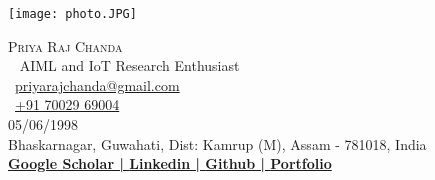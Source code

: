 \documentclass[a4paper]{article}
\begin{document}
\vspace*{-50pt}
\begin{center}
    \begin{minipage}{0.3\textwidth}
        \texttt{[image: photo.JPG]}
    \end{minipage}%
    \begin{minipage}{0.7\textwidth}
        \hspace*{0pt}
        {\Huge \scshape {Priya Raj Chanda}}\\\
        \vspace*{2mm}
        \hspace*{10pt}
        \faAngleDoubleRight AIML and IoT Research Enthusiast \\
        \vspace*{2pt}
        \hspace*{2pt}
        \faGoogle~\href{mailto:priyarajchanda@gmail.com}{priyarajchanda@gmail.com}\\
        \vspace*{2pt}
        \hspace*{2pt}
        \faPhone~\href{tel:+91 70029 69004}{+91 70029 69004}\\
        \vspace*{2pt}
        \hspace*{2pt}
        \faBirthdayCake \hspace{0.5pt} 05/06/1998\\
        \vspace*{2pt}
        \hspace*{2pt}
        \faMapMarker \hspace{0.5pt} Bhaskarnagar, Guwahati, Dist: Kamrup (M), Assam - 781018, India\\
        \vspace*{2pt}
        \hspace*{2pt}
        \textbf{\href{https://scholar.google.com/citations?user=nt04bqgAAAAJ&hl=en&authuser=2}{\faMortarBoard \hspace{0.5pt} Google Scholar | }}\textbf{\href{https://www.linkedin.com/in/priya-raj-chanda/}{\faLinkedin \hspace{0.5pt} Linkedin | }}\textbf{\href{https://github.com/Priyoraj}{\faGithub \hspace{0.5pt} Github | }}\textbf{\href{https://priyoraj.github.io/Portfolio/}{\faSuitcase \hspace{0.5pt} Portfolio}}\\
    \end{minipage}
\end{center}
\end{document}
